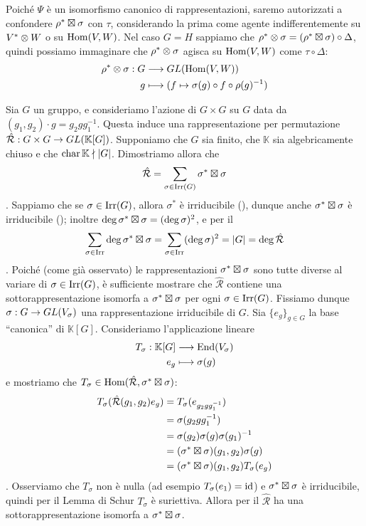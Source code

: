 Poiché $\Psi$ è un isomorfismo canonico di rappresentazioni, saremo autorizzati a confondere $\rho^*\boxtimes\sigma$ con $\tau$, considerando la prima come agente indifferentemente su $V^*\otimes W$ o su $\operatorname{Hom}(V,W)$. Nel caso $G=H$ sappiamo che $\rho^*\otimes\sigma=(\rho^*\boxtimes\sigma)\circ\Delta$, quindi possiamo immaginare che $\rho^*\otimes\sigma$ agisca su $\operatorname{Hom}(V,W)$ come $\tau\circ\Delta$:
\begin{align*}
\rho^*\otimes\sigma:G&\longrightarrow GL(\operatorname{Hom}(V,W))\\
g&\longmapsto(f\mapsto\sigma(g)\circ f\circ\rho(g)^{-1})
\end{align*}

\begin{example}
Sia $G$ un gruppo, e consideriamo l'azione di $G\times G$ su $G$ data da $(g_1,g_2)\cdot g=g_2gg_1^{-1}$. Questa induce una rappresentazione per permutazione $\hat{\mathcal{R}}:G\times G\to GL(\mathbb{K}[G])$. Supponiamo che $G$ sia finito, che $\mathbb{K}$ sia algebricamente chiuso e che $\operatorname{char}\mathbb{K}\nmid|G|$. Dimostriamo allora che
$$
\hat{\mathcal{R}}=\sum_{\sigma\in\operatorname{Irr}(G)}\sigma^*\boxtimes\sigma
$$
. Sappiamo che se $\sigma\in\operatorname{Irr}(G)$, allora $\sigma^*$ è irriducibile (), dunque anche $\sigma^*\boxtimes\sigma$ è irriducibile (); inoltre $\deg\sigma^*\boxtimes\sigma=(\deg\sigma)^2$, e per il 
$$
\sum_{\sigma\in\operatorname{Irr}}\deg\sigma^*\boxtimes\sigma=\sum_{\sigma\in\operatorname{Irr}}(\deg\sigma)^2=|G|=\deg\hat{\mathcal{R}}
$$
. Poiché (come già osservato) le rappresentazioni $\sigma^*\boxtimes\sigma$ sono tutte diverse al variare di $\sigma\in\operatorname{Irr}(G)$, è sufficiente mostrare che $\hat{\mathcal{R}}$ contiene una sottorappresentazione isomorfa a $\sigma^*\boxtimes\sigma$ per ogni $\sigma\in\operatorname{Irr}(G)$. Fissiamo dunque $\sigma:G\to GL(V_\sigma)$ una rappresentazione irriducibile di $G$. Sia $\{e_g\}_{g\in G}$ la base ``canonica'' di $\mathbb{K}[G]$. Consideriamo l'applicazione lineare
\begin{align*}
T_\sigma:\mathbb{K}[G]&\longrightarrow\operatorname{End}(V_\sigma)\\
e_g&\longmapsto\sigma(g)
\end{align*}
e mostriamo che $T_\sigma\in\operatorname{Hom}(\hat{\mathcal{R}},\sigma^*\boxtimes\sigma)$:
\begin{align*}
T_\sigma(\hat{\mathcal{R}}(g_1,g_2)e_g)&=T_\sigma(e_{g_2gg_1^{-1}})\\
&=\sigma(g_2gg_1^{-1})\\
&=\sigma(g_2)\sigma(g)\sigma(g_1)^{-1}\\
&=(\sigma^*\boxtimes\sigma)(g_1,g_2)\sigma(g)\\
&=(\sigma^*\boxtimes\sigma)(g_1,g_2)T_\sigma(e_g)
\end{align*}
. Osserviamo che $T_\sigma$ non è nulla (ad esempio $T_\sigma(e_1)=\operatorname{id}$) e $\sigma^*\boxtimes\sigma$ è irriducibile, quindi per il Lemma di Schur $T_\sigma$ è suriettiva. Allora per il  $\hat{\mathcal{R}}$ ha una sottorappresentazione isomorfa a $\sigma^*\boxtimes\sigma$.
\end{example}
